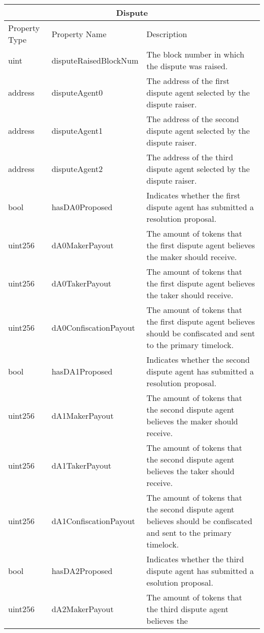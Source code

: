 \documentclass[11pt]{article}
\begin{document}
    \begin{longtable}[p]{ |p{3.75cm}|p{5cm}|p{6cm}| }
        \hline
        \multicolumn{3}{|c|}{Dispute} \\
        \hline
        Property Type & Property Name & Description \\
        \hline
        uint & disputeRaisedBlockNum & The block number in which the dispute was raised. \\
        address & disputeAgent0 & The address of the first dispute agent selected by the dispute
        raiser. \\
        address & disputeAgent1 & The address of the second dispute agent selected by the dispute
        raiser. \\
        address & disputeAgent2 & The address of the third dispute agent selected by the dispute
        raiser. \\
        bool & hasDA0Proposed & Indicates whether the first dispute agent has submitted a resolution
        proposal. \\
        uint256 & dA0MakerPayout & The amount of tokens that the first dispute agent believes the
        maker should receive. \\
        uint256 & dA0TakerPayout  & The amount of tokens that the first dispute agent believes the
        taker should receive. \\
        uint256 & dA0ConfiscationPayout & The amount of tokens that the first dispute agent believes
        should be confiscated and sent to the primary timelock.\\
        bool & hasDA1Proposed & Indicates whether the second dispute agent has submitted a
        resolution proposal. \\
        uint256 & dA1MakerPayout & The amount of tokens that the second dispute agent believes the
        maker should receive. \\
        uint256 & dA1TakerPayout  & The amount of tokens that the second dispute agent believes the
        taker should receive. \\
        uint256 & dA1ConfiscationPayout & The amount of tokens that the second dispute agent
        believes should be confiscated and sent to the primary timelock.\\
        bool & hasDA2Proposed & Indicates whether the third dispute agent has submitted a esolution
        proposal. \\
        uint256 & dA2MakerPayout & The amount of tokens that the third dispute agent believes the

\end{longtable}
\end{document}

